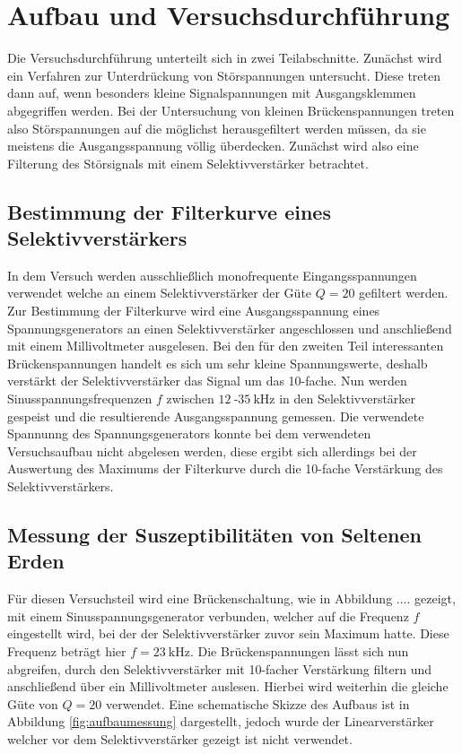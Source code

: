 \section{Aufbau und Versuchsdurchführung}

Die Versuchsdurchführung unterteilt sich in zwei Teilabschnitte. Zunächst wird ein Verfahren zur Unterdrückung von Störspannungen untersucht. Diese treten dann auf, wenn besonders kleine Signalspannungen mit Ausgangsklemmen abgegriffen werden.
Bei der Untersuchung von kleinen Brückenspannungen treten also Störspannungen auf die möglichst herausgefiltert werden müssen, da sie meistens die Ausgangsspannung völlig überdecken. Zunächst wird also eine Filterung des Störsignals mit
einem Selektivverstärker betrachtet.

\subsection{Bestimmung der Filterkurve eines Selektivverstärkers}
In dem Versuch werden ausschließlich monofrequente Eingangsspannungen verwendet welche an einem Selektivverstärker der Güte $Q = 20$ gefiltert werden. Zur Bestimmung der Filterkurve wird eine Ausgangsspannung eines Spannungsgenerators 
an einen Selektivverstärker angeschlossen und anschließend mit einem Millivoltmeter ausgelesen. 
Bei den für den zweiten Teil interessanten Brückenspannungen handelt es sich um sehr kleine Spannungswerte, deshalb verstärkt der Selektivverstärker das Signal um das 10-fache.
Nun werden Sinusspannungsfrequenzen $f$ zwischen $\SI{12}{}$-$\SI{35}{\kilo\hertz}$ in den Selektivverstärker gespeist und die resultierende Ausgangsspannung gemessen.
Die verwendete Spannunng des Spannungsgenerators konnte bei dem verwendeten Versuchsaufbau nicht abgelesen werden, diese ergibt sich allerdings bei der Auswertung des Maximums der Filterkurve durch die 10-fache Verstärkung des Selektivverstärkers.

\subsection{Messung der Suszeptibilitäten von Seltenen Erden} 
Für diesen Versuchsteil wird eine Brückenschaltung, wie in Abbildung .... gezeigt, mit einem Sinusspannungsgenerator verbunden, welcher auf die Frequenz $f$ eingestellt wird, bei der der Selektivverstärker zuvor sein Maximum hatte. Diese Frequenz beträgt hier $f = \SI{23}{\kilo\hertz}$.
Die Brückenspannungen lässt sich nun abgreifen, durch den Selektivverstärker mit 10-facher Verstärkung filtern und anschließend über ein Millivoltmeter auslesen. Hierbei wird weiterhin die gleiche Güte von $Q = 20$ verwendet.
Eine schematische Skizze des Aufbaus ist in Abbildung \ref{fig:aufbaumessung} dargestellt, jedoch wurde der Linearverstärker welcher vor dem Selektivverstärker gezeigt ist nicht verwendet.

